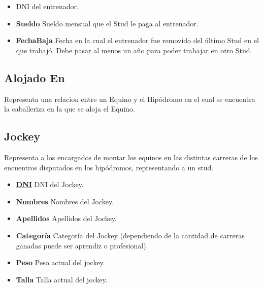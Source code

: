 \documentclass[a4paper,11pt]{article}
\begin{document}
\begin{itemize}

  \item \textbf{\uline{}} DNI del entrenador.

  \item \textbf{Sueldo} Sueldo mensual que el Stud le paga al entrenador.

  \item \textbf{FechaBaja} Fecha en la cual el entrenador fue removido del 
    último Stud en el que trabajó. Debe pasar al menos un año para poder
    trabajar en otro Stud. 
  
\end{itemize}

\subsection{Alojado En}

Representa una relacion entre un Equino y el Hipódromo en el cual
se encuentra la caballeriza en la que se aloja el Equino.

\subsection{Jockey}

Representa a los encargados de montar los equinos en las distintas carreras 
de los encuentros disputados en los hipódromos, representando a un stud.

\begin{itemize}

  \item \textbf{\uline{DNI}} DNI del Jockey.
  
  \item \textbf{Nombres} Nombres del Jockey.
  
  \item \textbf{Apellidos} Apellidos del Jockey.

  \item \textbf{Categoría} Categoría del Jockey (dependiendo de la cantidad
  de carreras ganadas puede ser aprendiz o profesional).
  
  \item \textbf{Peso} Peso actual del jockey.
  
  \item \textbf{Talla} Talla actual del jockey.  
  
\end{itemize}
\end{document}
